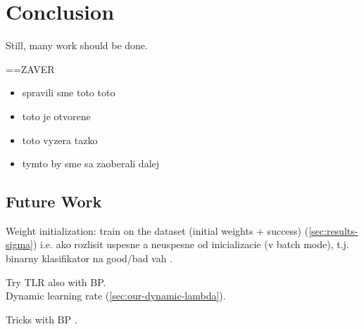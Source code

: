 \section*{Conclusion}
\label{sec:conclusion} 

Still, many work should be done. 


==ZAVER 
\begin{itemize} 
\item   spravili sme toto toto
\item   toto je otvorene
\item   toto vyzera tazko
\item   tymto by sme sa zaoberali dalej 
\end{itemize} 


\subsection*{Future Work} 
Weight initialization: train on the dataset (initial weights + success) (\ref{sec:results-sigma}) 
i.e. ako rozlisit uspesne a neuspesne od inicializacie (v batch mode), t.j. binarny klasifikator na good/bad vah . 

Try TLR also with BP.  \\ 

\label{sec:future-dlr} 
Dynamic learning rate (\ref{sec:our-dynamic-lambda}). 

Tricks with BP \citep{lecun2012efficient}. 



